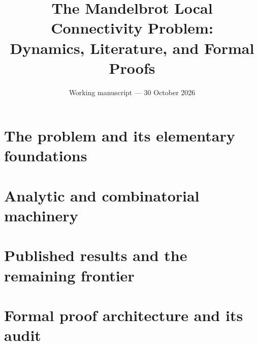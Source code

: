 \documentclass[11pt,a4paper,oneside,openany]{book}
\title{The Mandelbrot Local Connectivity Problem:\\
Dynamics, Literature, and Formal Proofs}
\author{}
\date{Working manuscript --- 30 October 2026}
\theoremstyle{definition}
\theoremstyle{remark}
\begin{document}
\frontmatter
\maketitle

\tableofcontents
\listoffigures
\clearpage

\mainmatter
\part{The problem and its elementary foundations}




\part{Analytic and combinatorial machinery}




\part{Published results and the remaining frontier}














\part{Formal proof architecture and its audit}




\appendix



\end{document}
